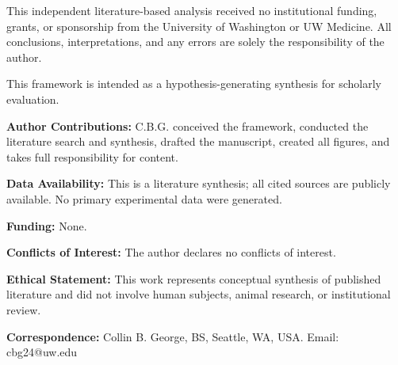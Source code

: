 \documentclass[12pt]{article}
\begin{document}
This independent literature-based analysis received no institutional funding, grants, or sponsorship from the University of Washington or UW Medicine. All conclusions, interpretations, and any errors are solely the responsibility of the author.

This framework is intended as a hypothesis-generating synthesis for scholarly evaluation.

\vspace{0.5cm}

\noindent \textbf{Author Contributions:} C.B.G. conceived the framework, conducted the literature search and synthesis, drafted the manuscript, created all figures, and takes full responsibility for content.

\noindent \textbf{Data Availability:} This is a literature synthesis; all cited sources are publicly available. No primary experimental data were generated.

\noindent \textbf{Funding:} None.

\noindent \textbf{Conflicts of Interest:} The author declares no conflicts of interest.

\noindent \textbf{Ethical Statement:} This work represents conceptual synthesis of published literature and did not involve human subjects, animal research, or institutional review.

\noindent \textbf{Correspondence:} Collin B. George, BS, Seattle, WA, USA. Email: cbg24@uw.edu

\clearpage


\end{document}
